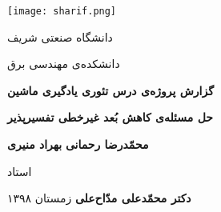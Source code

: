 \begin{titlepage}
\vspace*{0.5cm}
\begin{center}
\texttt{[image: sharif.png]}

 \large
 دانشگاه صنعتی شریف


دانشکده‌ی مهندسی برق

\vspace*{1cm}
\large
\textbf{گزارش پروژه‌‌ی درس تئوری یادگیری ماشین}



\vspace*{1.5cm}
\Huge
\textbf{	حل مسئله‌‌ی کاهش‌ بُعد غیرخطی تفسیر‌پذیر}     
\vspace{1.5cm}

\Large
\textbf{محمّدرضا رحمانی}
\hspace{1cm}
\textbf{بهراد منیری}

\vspace{1.5cm}

استاد
\vspace{0.5cm}

\textbf{دکتر محمّدعلی مدّاح‌علی}
\vfill
\Large
زمستان ۱۳۹۸
\end{center}
\end{titlepage}
